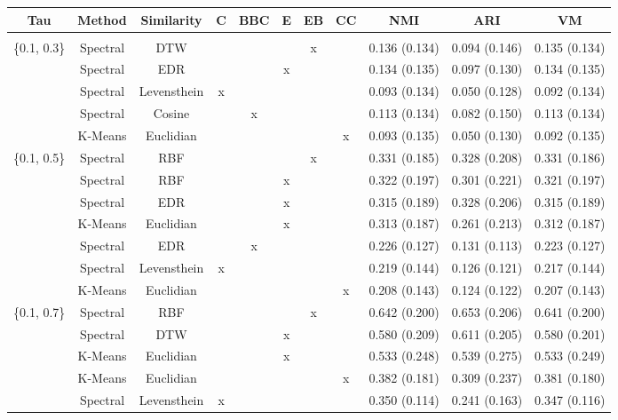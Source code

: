 \documentclass[12pt,a4paper,bibliography=totocnumbered,listof=totocnumbered]{scrartcl}
\begin{document}
\begin{table}[!htbp] \centering 
	\label{} 
	\scriptsize
	\begin{tabularx}{\textwidth}{ ccccccccccc} 
		\\\toprule
		Tau & Method & Similarity & C & BBC & E & EB & CC & NMI & ARI & VM \\ 
		\hline \\[-1.8ex] 
		\{0.1, 0.3\} & Spectral & DTW &  &  &  & x &  & 0.136 (0.134) & 0.094 (0.146) & 0.135 (0.134) \\ 
		& Spectral & EDR &  &  & x &  &  & 0.134 (0.135) & 0.097 (0.130) & 0.134 (0.135) \\ 
		& Spectral & Levensthein & x &  &  &  &  & 0.093 (0.134) & 0.050 (0.128) & 0.092 (0.134) \\ 
		& Spectral & Cosine &  & x &  &  &  & 0.113 (0.134) & 0.082 (0.150) & 0.113 (0.134) \\ 
		& K-Means & Euclidian &  &  &  &  & x & 0.093 (0.135) & 0.050 (0.130) & 0.092 (0.135) \\ 
		\{0.1, 0.5\} & Spectral & RBF &  &  &  & x &  & 0.331 (0.185) & 0.328 (0.208) & 0.331 (0.186) \\ 
		& Spectral & RBF &  &  & x &  &  & 0.322 (0.197) & 0.301 (0.221) & 0.321 (0.197) \\ 
		& Spectral & EDR &  &  & x &  &  & 0.315 (0.189) & 0.328 (0.206) & 0.315 (0.189) \\ 
		& K-Means & Euclidian &  &  & x &  &  & 0.313 (0.187) & 0.261 (0.213) & 0.312 (0.187) \\ 
		& Spectral & EDR &  & x &  &  &  & 0.226 (0.127) & 0.131 (0.113) & 0.223 (0.127) \\ 
		& Spectral & Levensthein & x &  &  &  &  & 0.219 (0.144) & 0.126 (0.121) & 0.217 (0.144) \\ 
		& K-Means & Euclidian &  &  &  &  & x & 0.208 (0.143) & 0.124 (0.122) & 0.207 (0.143) \\ 
		\{0.1, 0.7\} & Spectral & RBF &  &  &  & x &  & 0.642 (0.200) & 0.653 (0.206) & 0.641 (0.200) \\ 
		& Spectral & DTW &  &  & x &  &  & 0.580 (0.209) & 0.611 (0.205) & 0.580 (0.201) \\ 
		& K-Means & Euclidian &  &  & x &  &  & 0.533 (0.248) & 0.539 (0.275) & 0.533 (0.249) \\ 
		& K-Means & Euclidian &  &  &  &  & x & 0.382 (0.181) & 0.309 (0.237) & 0.381 (0.180) \\ 
		& Spectral & Levensthein & x &  &  &  &  & 0.350 (0.114) & 0.241 (0.163) & 0.347 (0.116) \\ 

\end{tabularx}
\end{table}
\end{document}
